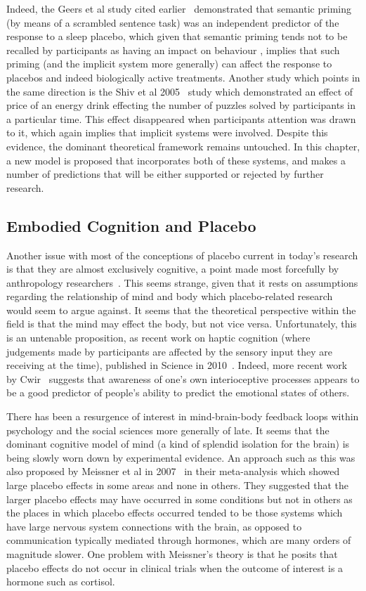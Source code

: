 Indeed, the Geers et al study cited earlier~\cite{Geers2005} demonstrated that semantic priming (by means of a scrambled sentence task) was an independent predictor of the response to a sleep placebo, which given that semantic priming tends not to be recalled by participants as having an impact on behaviour \cite{Wittenbrink2007}, implies that such priming (and the implicit system more generally) can affect the response to placebos and indeed biologically active treatments. Another study which points in the same direction is the Shiv et al 2005~\cite{Shiv2005a} study which demonstrated an effect of price of an energy drink effecting the number of puzzles solved by participants in a particular time. This effect disappeared when participants attention was drawn to it, which again implies that implicit systems were involved. Despite this evidence, the dominant theoretical framework remains untouched. In this chapter, a new model is  proposed that incorporates both of these systems, and makes a number of predictions that will be either supported or rejected by further research. 

\subsection{Embodied Cognition and Placebo}
\label{sec:embod-cogn-plac}
Another issue with most of the conceptions of placebo current in today's research is that they are almost exclusively cognitive, a point made most forcefully by anthropology researchers~\cite{Thompson2009}.
This seems strange, given that it rests on assumptions regarding the relationship of mind and body which placebo-related research would seem to argue against. It seems that the theoretical perspective within the field is that the mind may effect the body, but not vice versa. Unfortunately, this is an untenable proposition, as recent work on haptic cognition (where judgements made by participants are affected by the sensory input they are receiving at the time), published in Science in 2010~\cite{ackerman2010incidental}.
Indeed, more recent work by Cwir~\cite{cwir2011your} suggests that awareness of one's own interioceptive processes appears to be a good predictor of people's ability to predict the emotional states of others. 


There has been a resurgence of interest in mind-brain-body feedback loops within psychology and the social sciences more generally of late. It seems that the dominant cognitive model of mind (a kind of splendid isolation for the brain) is being slowly worn down by experimental evidence. An approach such as this was also proposed by Meissner et al in 2007~\cite{Meissner2007} in their meta-analysis which showed large placebo effects in some areas and none in others. They suggested that the larger placebo effects may have occurred in some conditions but not in others as the places in which placebo effects occurred tended to be those systems which have large nervous system connections with the brain, as opposed to communication typically mediated through hormones, which are many orders of magnitude slower. One problem with Meissner's theory is that he posits that placebo effects do not occur in clinical trials when the outcome of interest is a hormone such as cortisol. 

